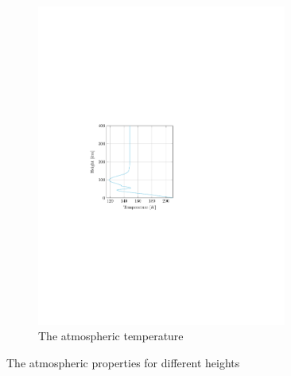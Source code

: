 \begin{figure}[h]
\begin{subfigure}{0.45\textwidth}
	\includegraphics[trim={4cm 9.8cm 9cm 10cm},clip,width=0.9\textwidth]{Figure/atmos_model/temperature.pdf}
	\caption{The atmospheric temperature}
	\label{fig:atmos_height_T}
	\end{subfigure}
	\caption{The atmospheric properties for different heights}
	\label{fig:atmos_height}
\end{figure}

